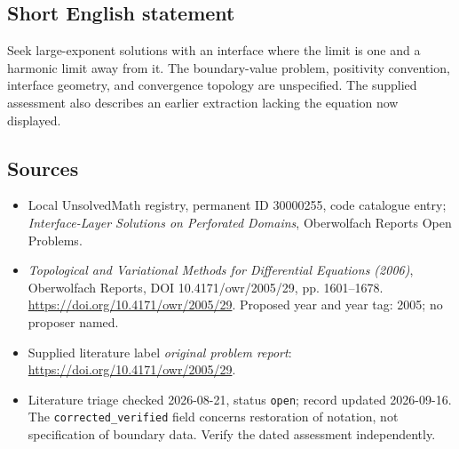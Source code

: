 \documentclass[11pt]{article}
\begin{document}
\subsection{Short English statement}
Seek large-exponent solutions with an interface where the limit is one and a harmonic limit away from it. The boundary-value problem, positivity convention, interface geometry, and convergence topology are unspecified. The supplied assessment also describes an earlier extraction lacking the equation now displayed.
\subsection{Sources}
\begin{itemize}\item Local UnsolvedMath registry, permanent ID 30000255, code catalogue entry; \emph{Interface-Layer Solutions on Perforated Domains}, Oberwolfach Reports Open Problems.\item \emph{Topological and Variational Methods for Differential Equations (2006)}, Oberwolfach Reports, DOI 10.4171/owr/2005/29, pp. 1601--1678. \url{https://doi.org/10.4171/owr/2005/29}. Proposed year and year tag: 2005; no proposer named.\item Supplied literature label \emph{original problem report}: \url{https://doi.org/10.4171/owr/2005/29}.\item Literature triage checked 2026-08-21, status \texttt{open}; record updated 2026-09-16. The \texttt{corrected\_verified} field concerns restoration of notation, not specification of boundary data. Verify the dated assessment independently.\end{itemize}
\end{document}
